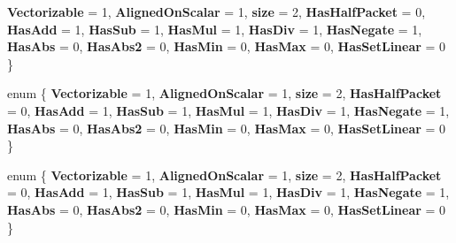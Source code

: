 \begin{DoxyCompactItemize}
{\bfseries Vectorizable} = 1, 
{\bfseries Aligned\+On\+Scalar} = 1, 
{\bfseries size} = 2, 
{\bfseries Has\+Half\+Packet} = 0, 
\newline
{\bfseries Has\+Add} = 1, 
{\bfseries Has\+Sub} = 1, 
{\bfseries Has\+Mul} = 1, 
{\bfseries Has\+Div} = 1, 
\newline
{\bfseries Has\+Negate} = 1, 
{\bfseries Has\+Abs} = 0, 
{\bfseries Has\+Abs2} = 0, 
{\bfseries Has\+Min} = 0, 
\newline
{\bfseries Has\+Max} = 0, 
{\bfseries Has\+Set\+Linear} = 0
 \}
\item 
\mbox{\label{struct_eigen_1_1internal_1_1packet__traits_3_01std_1_1complex_3_01float_01_4_01_4_a9cbc8a9ec68cda16641e5c8efc9034ac}} 
enum \{ \newline
{\bfseries Vectorizable} = 1, 
{\bfseries Aligned\+On\+Scalar} = 1, 
{\bfseries size} = 2, 
{\bfseries Has\+Half\+Packet} = 0, 
\newline
{\bfseries Has\+Add} = 1, 
{\bfseries Has\+Sub} = 1, 
{\bfseries Has\+Mul} = 1, 
{\bfseries Has\+Div} = 1, 
\newline
{\bfseries Has\+Negate} = 1, 
{\bfseries Has\+Abs} = 0, 
{\bfseries Has\+Abs2} = 0, 
{\bfseries Has\+Min} = 0, 
\newline
{\bfseries Has\+Max} = 0, 
{\bfseries Has\+Set\+Linear} = 0
 \}
\item 
\mbox{\label{struct_eigen_1_1internal_1_1packet__traits_3_01std_1_1complex_3_01float_01_4_01_4_ab9de8a89727f3cd6dac9f7ee86ed9d17}} 
enum \{ \newline
{\bfseries Vectorizable} = 1, 
{\bfseries Aligned\+On\+Scalar} = 1, 
{\bfseries size} = 2, 
{\bfseries Has\+Half\+Packet} = 0, 
\newline
{\bfseries Has\+Add} = 1, 
{\bfseries Has\+Sub} = 1, 
{\bfseries Has\+Mul} = 1, 
{\bfseries Has\+Div} = 1, 
\newline
{\bfseries Has\+Negate} = 1, 
{\bfseries Has\+Abs} = 0, 
{\bfseries Has\+Abs2} = 0, 
{\bfseries Has\+Min} = 0, 
\newline
{\bfseries Has\+Max} = 0, 
{\bfseries Has\+Set\+Linear} = 0
 \}
\item 
\mbox{\label{struct_eigen_1_1internal_1_1packet__traits_3_01std_1_1complex_3_01float_01_4_01_4_ad01877b687c4ca68a10027dbd3b6de8c}} 

\end{DoxyCompactItemize}
